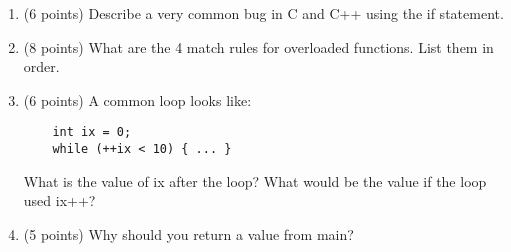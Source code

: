 \documentclass{article}
\begin{document}
\begin{enumerate}
\item (6 points) Describe a very common bug in C and C++ using
the if statement.

\item (8 points) What are the 4 match rules for overloaded functions.
List them in order.

\item (6 points) A common loop looks like:
\begin{verbatim}
    int ix = 0;
    while (++ix < 10) { ... }
\end{verbatim}
What is the value of ix after the loop?  What would be the value if the
loop used ix++?

\item (5 points)  Why should you return a value from main?

\end{enumerate}

\end{document}
